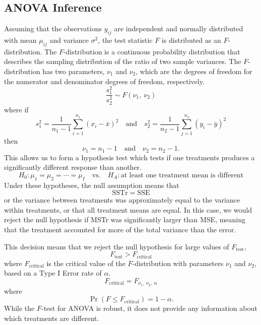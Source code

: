 \documentclass{article}
\begin{document}
\subsection{ANOVA Inference}
Assuming that the observations \(y_{ij}\) are independent and normally distributed with mean \(\mu_{ij}\) and variance \(\sigma^2\),
the test statistic \(F\) is distributed as an \(F\)-distribution. The \(F\)-distribution is a continuous probability distribution that describes
the sampling distribution of the ratio of two sample variances. The \(F\)-distribution has two parameters, \(\nu_1\) and \(\nu_2\), which are the
degrees of freedom for the numerator and denominator degrees of freedom, respectively.
\begin{equation*}
    \frac{s_1^2}{s_2^2} \sim F\left( \nu_1,\: \nu_2 \right)
\end{equation*}
where if
\begin{equation*}
    s_1^2 = \frac{1}{n_1 - 1} \sum_{i = 1}^{n_1} \left( x_i - \overline{x} \right)^2 \quad \text{and} \quad s_2^2 = \frac{1}{n_2 - 1} \sum_{j = 1}^{n_2} \left( y_i - \overline{y} \right)^2
\end{equation*}
then
\begin{equation*}
    \nu_1 = n_1 - 1 \quad \text{and} \quad \nu_2 = n_2 - 1.
\end{equation*}
This allows us to form a hypothesis test which tests if one treatments produces a significantly different response than another.
\begin{equation*}
    H_0: \mu_1 = \mu_2 = \cdots = \mu_I \quad \text{vs.} \quad H_A: \text{at least one treatment mean is different}
\end{equation*}
Under these hypotheses, the null assumption means that
\begin{equation*}
    \mathrm{SSTr} = \mathrm{SSE}
\end{equation*}
or the variance between treatments was approximately equal to the variance within treatments, or that
all treatment means are equal. In this case, we would reject the null hypothesis if MSTr was significantly larger than MSE,
meaning that the treatment accounted for more of the total variance than the error.

This decision means that we reject the null hypothesis for large values of \(F_{\mathrm{test}}\),
\begin{equation*}
    F_{\mathrm{test}} > F_\mathrm{critical}
\end{equation*}
where \(F_\mathrm{critical}\) is the critical value of the \(F\)-distribution with parameters \(\nu_1\) and \(\nu_2\), based
on a Type I Error rate of \(\alpha\).
\begin{equation*}
    F_\mathrm{critical} = F_{\nu_1,\: \nu_2,\: \alpha}
\end{equation*}
where
\begin{equation*}
    \Pr{\left( F \leq F_\mathrm{critical} \right)} = 1 - \alpha.
\end{equation*}
While the \(F\)-test for ANOVA is robust, it does not provide any information about which treatments are different.
\end{document}
